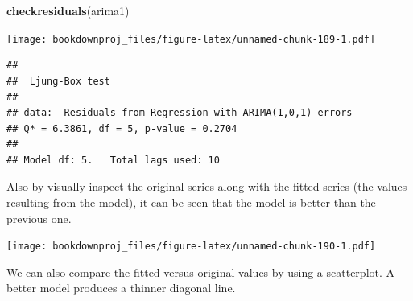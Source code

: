 \documentclass[
]{article}
\newenvironment{Shaded}{\begin{snugshade}}{\end{snugshade}}
\newcommand{\DataTypeTok}[1]{\textcolor[rgb]{0.13,0.29,0.53}{#1}}
\newcommand{\DecValTok}[1]{\textcolor[rgb]{0.00,0.00,0.81}{#1}}
\newcommand{\KeywordTok}[1]{\textcolor[rgb]{0.13,0.29,0.53}{\textbf{#1}}}
\newcommand{\NormalTok}[1]{#1}
\newcommand{\OperatorTok}[1]{\textcolor[rgb]{0.81,0.36,0.00}{\textbf{#1}}}
\newcommand{\StringTok}[1]{\textcolor[rgb]{0.31,0.60,0.02}{#1}}
\begin{document}
\begin{Shaded}
\begin{Highlighting}[]
\KeywordTok{checkresiduals}\NormalTok{(arima1)}
\end{Highlighting}
\end{Shaded}

\texttt{[image: bookdownproj\_files/figure-latex/unnamed-chunk-189-1.pdf]}

\begin{verbatim}
## 
##  Ljung-Box test
## 
## data:  Residuals from Regression with ARIMA(1,0,1) errors
## Q* = 6.3861, df = 5, p-value = 0.2704
## 
## Model df: 5.   Total lags used: 10
\end{verbatim}

Also by visually inspect the original series along with the fitted series (the values resulting from the model), it can be seen that the model is better than the previous one.

\begin{Shaded}
\end{Shaded}

\texttt{[image: bookdownproj\_files/figure-latex/unnamed-chunk-190-1.pdf]}

We can also compare the fitted versus original values by using a scatterplot. A better model produces a thinner diagonal line.

\begin{Shaded}
\end{Shaded}
\end{document}
